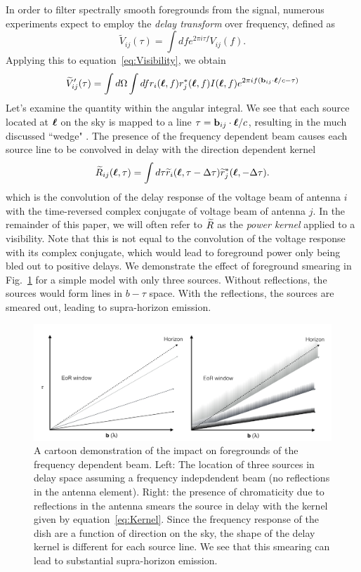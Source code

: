 \documentclass[twocolumn]{emulateapj}
\begin{document}
In order to filter spectrally smooth foregrounds from the signal, numerous experiments expect to employ the {\it delay transform} over frequency, defined as \citep{Parsons:2012}
\begin{equation}
\widetilde{V}_{ij}(\tau) = \int d f e^{2 \pi i \tau f} V_{ij}(f).
\end{equation}
Applying this to equation~\ref{eq:Visibility}, we obtain
\begin{equation}
\widetilde{V}'_{ij}(\tau)=  \int d \Omega \int d f  r_i(\bl,f) r_j^*(\bl,f)  I(\bl,f) e^{2 \pi i f ( \bb_{ij} \cdot \bl /c - \tau)}
\end{equation}
Let's examine the quantity within the angular integral. We see that each source located at $\boldsymbol{\ell}$ on the sky is mapped to a line $\tau ={\bf b}_{ij}\cdot \boldsymbol{\ell}/c$, resulting in the much discussed ``wedge" \citep{Datta:2010,Vedantham:2012,Parsons:2012,Morales:2012,Thyagarajan:2013,Liu:2014a,Liu:2014b}. The presence of the frequency dependent beam causes each source line to be convolved in delay with the direction dependent kernel
\begin{equation}\label{eq:Kernel}
\ftR_{ij}(\bl,\tau) = \int d \tau \ftr_i(\bl,\tau - \Delta \tau) \ftr^*_j(\bl,-\Delta \tau).
\end{equation}
which is the convolution of the delay response of the voltage beam of antenna $i$ with the time-reversed complex conjugate of voltage beam of antenna $j$. In the remainder of this paper, we will often refer to ${\widetilde{R}}$ as the {\it power kernel} applied to a visibility. Note that this is not equal to the convolution of the voltage response with its complex conjugate, which would lead to foreground power only being bled out to positive delays. We demonstrate the effect of foreground smearing in Fig.~\ref{fig:Smearing} for a simple model with only three sources. Without reflections, the sources would form lines in $b-\tau$ space. With the reflections, the sources are smeared out, leading to supra-horizon emission. 
\begin{figure}
\includegraphics[width=\textwidth]{figures/wedgeCompare.pdf}
\caption{A cartoon demonstration of the impact on foregrounds of the frequency dependent beam. Left: The location of three sources in delay space assuming a frequency indepdendent beam (no reflections in the antenna element). Right: the presence of chromaticity due to reflections in the antenna smears the source in delay with the kernel given by equation~\ref{eq:Kernel}. Since the frequency response of the dish are a function of direction on the sky, the shape of the delay kernel is different for each source line. We see that this smearing can lead to substantial supra-horizon emission.}
\label{fig:Smearing}
\end{figure}
\end{document}
